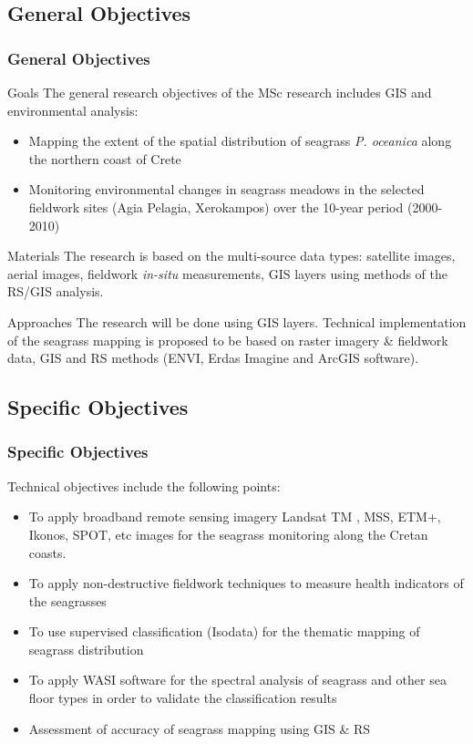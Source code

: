 \documentclass[pdflatex,compress,8pt,
	xcolor={dvipsnames,dvipsnames,svgnames,x11names,table},
	hyperref={colorlinks = true,breaklinks = true, urlcolor = NavyBlue, breaklinks = true}]{beamer}
\begin{document}
\subsection{General Objectives}
\begin{frame}\frametitle{General Objectives}
\begin{block}{Goals}
The general research objectives of the MSc research includes GIS and environmental analysis:
\begin{itemize}
	\item Mapping the extent of the spatial distribution of seagrass \emph{P. oceanica} along the northern coast of Crete
	\item Monitoring environmental changes in seagrass meadows in the selected fieldwork sites (Agia Pelagia, Xerokampos) over the 10-year period (2000-2010)
\end{itemize}
\end{block}

\begin{block}{Materials}
The research is based on the multi-source data types: \alert{satellite images, aerial images, fieldwork \emph{in-situ} measurements, GIS layers} using methods of the RS/GIS analysis.
\end{block}

\begin{block}{Approaches}
The research will be done using GIS layers. Technical implementation of the seagrass mapping is proposed to be based on raster imagery \& fieldwork data, GIS and RS methods (ENVI, Erdas Imagine and ArcGIS software).
\end{block}

\end{frame}

\subsection{Specific Objectives}
\begin{frame}\frametitle{Specific Objectives}
Technical objectives include the following points: 
\begin{itemize}
	\item To apply broadband remote sensing imagery Landsat TM , MSS, ETM+, Ikonos, SPOT, etc images for the seagrass monitoring along the Cretan coasts.
	\item To apply non-destructive fieldwork techniques to measure health indicators of the seagrasses
	\item To use supervised classification (Isodata) for the thematic mapping of seagrass distribution
	\item To apply WASI software for the spectral analysis of seagrass and other sea floor types in order to validate the classification results
	\item Assessment of accuracy of seagrass mapping using GIS \& RS
\end{itemize}
\end{frame}
\end{document}
